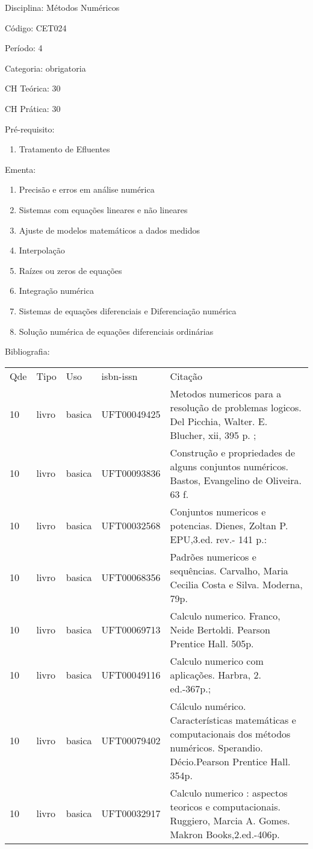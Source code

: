 \documentclass[12pt,a4paper,twoside]{report}
\begin{document}
Disciplina: Métodos Numéricos

Código: CET024

Período: 4

Categoria: obrigatoria

CH Teórica: 30

CH Prática: 30




Pré-requisito:
\begin{enumerate}
\item Tratamento de Efluentes
\end{enumerate}

Ementa:
\begin{enumerate}
\item Precisão e erros em análise numérica
\item Sistemas com equações lineares e não lineares
\item Ajuste de modelos matemáticos a dados medidos
\item Interpolação
\item Raízes ou zeros de equações
\item Integração numérica
\item Sistemas de equações diferenciais e Diferenciação numérica
\item Solução numérica de equações diferenciais ordinárias
\end{enumerate}



Bibliografia:


\begin{tabular}{llllp{8cm}}
Qde & Tipo & Uso & isbn-issn & Citação \\
10&livro&basica&UFT00049425&Metodos numericos para a resolução de problemas logicos. Del Picchia, Walter. E. Blucher, xii, 395 p. ;\\
10&livro&basica&UFT00093836&Construção e propriedades de alguns conjuntos numéricos. Bastos, Evangelino de Oliveira. 63 f.\\
10&livro&basica&UFT00032568&Conjuntos numericos e potencias. Dienes, Zoltan P. EPU,3.ed. rev.- 141 p.:\\
10&livro&basica&UFT00068356&Padrões numericos e sequências. Carvalho, Maria Cecilia Costa e Silva. Moderna, 79p.\\
10&livro&basica&UFT00069713&Calculo numerico. Franco, Neide Bertoldi. Pearson Prentice Hall. 505p.\\
10&livro&basica&UFT00049116&Calculo numerico com aplicações. Harbra, 2. ed.-367p.;\\
10&livro&basica&UFT00079402&Cálculo numérico. Características matemáticas e computacionais dos métodos numéricos. Sperandio. Décio.Pearson Prentice Hall. 354p.\\
10&livro&basica&UFT00032917&Calculo numerico : aspectos teoricos e computacionais. Ruggiero, Marcia A. Gomes. Makron Books,2.ed.-406p.\\
\end{tabular}
\end{document}
